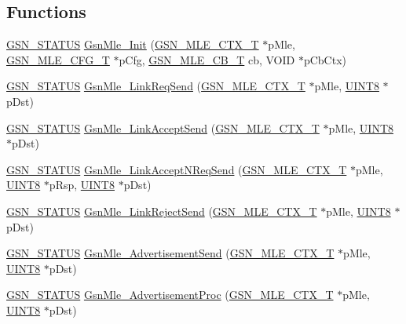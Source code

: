 \subsection*{Functions}
\begin{DoxyCompactItemize}
\item 
\hyperlink{a00660_gada5951904ac6110b1fa95e51a9ddc217}{GSN\_\-STATUS} \hyperlink{a00527_aae9dd0488767a7fe618cc5d97d916c1c}{GsnMle\_\-Init} (\hyperlink{a00151}{GSN\_\-MLE\_\-CTX\_\-T} $\ast$pMle, \hyperlink{a00150}{GSN\_\-MLE\_\-CFG\_\-T} $\ast$pCfg, \hyperlink{a00527_ab913f34ba94e3fffc3ebcc67f2df5c3e}{GSN\_\-MLE\_\-CB\_\-T} cb, VOID $\ast$pCbCtx)
\item 
\hyperlink{a00660_gada5951904ac6110b1fa95e51a9ddc217}{GSN\_\-STATUS} \hyperlink{a00527_a27abe7002f7fd7540f7d00cd5821f3bb}{GsnMle\_\-LinkReqSend} (\hyperlink{a00151}{GSN\_\-MLE\_\-CTX\_\-T} $\ast$pMle, \hyperlink{a00660_gab27e9918b538ce9d8ca692479b375b6a}{UINT8} $\ast$pDst)
\item 
\hyperlink{a00660_gada5951904ac6110b1fa95e51a9ddc217}{GSN\_\-STATUS} \hyperlink{a00527_a451622f5b56db013ebccf1893198f39b}{GsnMle\_\-LinkAcceptSend} (\hyperlink{a00151}{GSN\_\-MLE\_\-CTX\_\-T} $\ast$pMle, \hyperlink{a00660_gab27e9918b538ce9d8ca692479b375b6a}{UINT8} $\ast$pDst)
\item 
\hyperlink{a00660_gada5951904ac6110b1fa95e51a9ddc217}{GSN\_\-STATUS} \hyperlink{a00527_a4caa5b86d20f80195bab5d8a3f116213}{GsnMle\_\-LinkAcceptNReqSend} (\hyperlink{a00151}{GSN\_\-MLE\_\-CTX\_\-T} $\ast$pMle, \hyperlink{a00660_gab27e9918b538ce9d8ca692479b375b6a}{UINT8} $\ast$pRsp, \hyperlink{a00660_gab27e9918b538ce9d8ca692479b375b6a}{UINT8} $\ast$pDst)
\item 
\hyperlink{a00660_gada5951904ac6110b1fa95e51a9ddc217}{GSN\_\-STATUS} \hyperlink{a00527_a0e78fdff88a1018384efe9beb9784feb}{GsnMle\_\-LinkRejectSend} (\hyperlink{a00151}{GSN\_\-MLE\_\-CTX\_\-T} $\ast$pMle, \hyperlink{a00660_gab27e9918b538ce9d8ca692479b375b6a}{UINT8} $\ast$pDst)
\item 
\hyperlink{a00660_gada5951904ac6110b1fa95e51a9ddc217}{GSN\_\-STATUS} \hyperlink{a00527_a7f04695ae7dfb556e9a0685379405611}{GsnMle\_\-AdvertisementSend} (\hyperlink{a00151}{GSN\_\-MLE\_\-CTX\_\-T} $\ast$pMle, \hyperlink{a00660_gab27e9918b538ce9d8ca692479b375b6a}{UINT8} $\ast$pDst)
\item 
\hyperlink{a00660_gada5951904ac6110b1fa95e51a9ddc217}{GSN\_\-STATUS} \hyperlink{a00527_a19e624f9c7a659ed3a3c4aecee3caab2}{GsnMle\_\-AdvertisementProc} (\hyperlink{a00151}{GSN\_\-MLE\_\-CTX\_\-T} $\ast$pMle, \hyperlink{a00660_gab27e9918b538ce9d8ca692479b375b6a}{UINT8} $\ast$pDst)

\end{DoxyCompactItemize}
